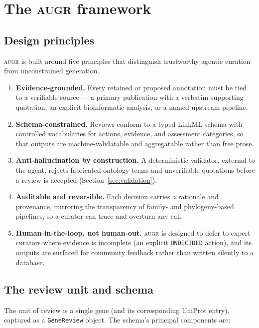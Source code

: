 \documentclass[11pt]{article}
\providecommand{\tightlist}{%
  \setlength{\itemsep}{0pt}\setlength{\parskip}{0pt}}
\newcommand{\augr}{\textsc{augr}}
\newcommand{\code}[1]{\texttt{#1}}
\begin{document}
\section{The \augr{} framework}
\label{sec:framework}

\subsection{Design principles}

\augr{} is built around five principles that distinguish trustworthy agentic
curation from unconstrained generation.

\begin{enumerate}
\tightlist
\item \textbf{Evidence-grounded.} Every retained or proposed annotation must be
tied to a verifiable source --- a primary publication with a verbatim supporting
quotation, an explicit bioinformatic analysis, or a named upstream pipeline.
\item \textbf{Schema-constrained.} Reviews conform to a typed LinkML schema
\cite{linkml} with controlled vocabularies for actions, evidence, and assessment
categories, so that outputs are machine-validatable and aggregatable rather than
free prose.
\item \textbf{Anti-hallucination by construction.} A deterministic validator,
external to the agent, rejects fabricated ontology terms and unverifiable
quotations before a review is accepted (Section~\ref{sec:validation}).
\item \textbf{Auditable and reversible.} Each decision carries a rationale and
provenance, mirroring the transparency of family- and phylogeny-based pipelines,
so a curator can trace and overturn any call.
\item \textbf{Human-in-the-loop, not human-out.} \augr{} is designed to defer to
expert curators where evidence is incomplete (an explicit \code{UNDECIDED}
action), and its outputs are surfaced for community feedback rather than written
silently to a database.
\end{enumerate}

\subsection{The review unit and schema}

The unit of review is a single gene (and its corresponding UniProt entry),
captured as a \code{GeneReview} object. The schema's principal components are:
\end{document}
